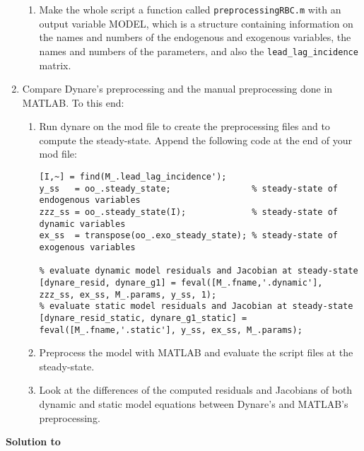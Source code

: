 \begin{enumerate}
\begin{enumerate}
  \item
  Make the whole script a function called \texttt{preprocessingRBC.m}
    with an output variable MODEL,
	which is a structure containing information on the names
	and numbers of the endogenous and exogenous variables,
	the names and numbers of the parameters,
	and also the \texttt{lead\_lag\_incidence} matrix.

\end{enumerate}

\item Compare Dynare's preprocessing and the manual preprocessing done in MATLAB.\@
To this end:

\begin{enumerate}
  \item
  Run dynare on the mod file to create the preprocessing files
	and to compute the steady-state.
  Append the following code at the end of your mod file:
\begin{lstlisting}[style=Matlab-editor,basicstyle=\mlttfamily\scriptsize]
% create steady-state vectors
[I,~] = find(M_.lead_lag_incidence');
y_ss   = oo_.steady_state;                % steady-state of endogenous variables
zzz_ss = oo_.steady_state(I);             % steady-state of dynamic variables
ex_ss  = transpose(oo_.exo_steady_state); % steady-state of exogenous variables

% evaluate dynamic model residuals and Jacobian at steady-state
[dynare_resid, dynare_g1] = feval([M_.fname,'.dynamic'], zzz_ss, ex_ss, M_.params, y_ss, 1);
% evaluate static model residuals and Jacobian at steady-state
[dynare_resid_static, dynare_g1_static] = feval([M_.fname,'.static'], y_ss, ex_ss, M_.params);
\end{lstlisting}

  \item
  Preprocess the model with MATLAB and evaluate the script files at the steady-state.

  \item
  Look at the differences of the computed residuals
    and Jacobians of both dynamic and static model equations
	between Dynare's and MATLAB's preprocessing.

\end{enumerate}

\end{enumerate}


\begin{solution}\textbf{Solution to }
\ifDisplaySolutions%

\fi
\newpage
\end{solution}